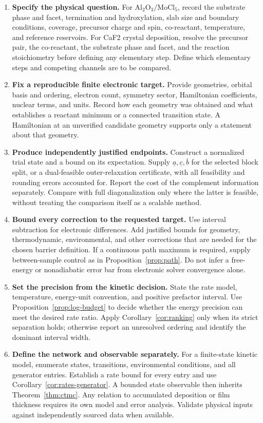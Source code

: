 \documentclass[11pt,a4paper]{article}
\theoremstyle{plain}
\theoremstyle{definition}
\theoremstyle{remark}
\begin{document}
\begin{enumerate}
\item \textbf{Specify the physical question.}
For $\mathrm{Al_2O_3}/\mathrm{MoCl_5}$, record the substrate phase and
facet, termination and hydroxylation, slab size and boundary conditions,
coverage, precursor charge and spin, co-reactant, temperature, and reference
reservoirs. For CaF2 crystal deposition, resolve the precursor pair, the
co-reactant, the substrate phase and facet, and the reaction stoichiometry
before defining any elementary step.
Define which elementary steps and competing channels are to be compared.

\item \textbf{Fix a reproducible finite electronic target.}
Provide geometries, orbital basis and ordering, electron count, symmetry
sector, Hamiltonian coefficients, nuclear terms, and units. Record how each
geometry was obtained and what establishes a reactant minimum or a connected
transition state. A Hamiltonian at an unverified candidate geometry supports
only a statement about that geometry.

\item \textbf{Produce independently justified endpoints.}
Construct a normalized trial state and a bound on its expectation. Supply
$\underline a,\underline c,\overline b$ for the selected block split,
or a dual-feasible outer-relaxation certificate, with all feasibility and
rounding errors accounted for. Report the cost of the complement information
separately. Compare with full diagonalization only where the latter is
feasible, without treating the comparison itself as a scalable method.

\item \textbf{Bound every correction to the requested target.}
Use interval subtraction for electronic differences. Add justified bounds
for geometry, thermodynamic, environmental, and other corrections that are
needed for the chosen barrier definition. If a continuous path maximum is
required, supply between-sample control as in Proposition~\ref{prop:path}.
Do not infer a free-energy or nonadiabatic error bar from electronic solver
convergence alone.

\item \textbf{Set the precision from the kinetic decision.}
State the rate model, temperature, energy-unit convention, and positive
prefactor interval. Use Proposition~\ref{prop:log-budget} to decide whether
the energy precision can meet the desired rate ratio. Apply
Corollary~\ref{cor:ranking} only when its strict separation holds; otherwise
report an unresolved ordering and identify the dominant interval width.

\item \textbf{Define the network and observable separately.}
For a finite-state kinetic model, enumerate states, transitions, environmental
conditions, and all generator entries. Establish a rate bound for every entry
and use Corollary~\ref{cor:rates-generator}. A bounded state observable then
inherits Theorem~\ref{thm:ctmc}. Any relation to accumulated deposition or
film thickness requires its own model and error analysis. Validate physical
inputs against independently sourced data when available.
\end{enumerate}
\end{document}
